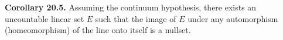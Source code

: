 \textbf{Corollary 20.5.} Assuming the continuum hypothesis, there exists an uncountable linear set $E$ such that the image of $E$ under any automorphism (homeomorphism) of the line onto itself is a nullset.
